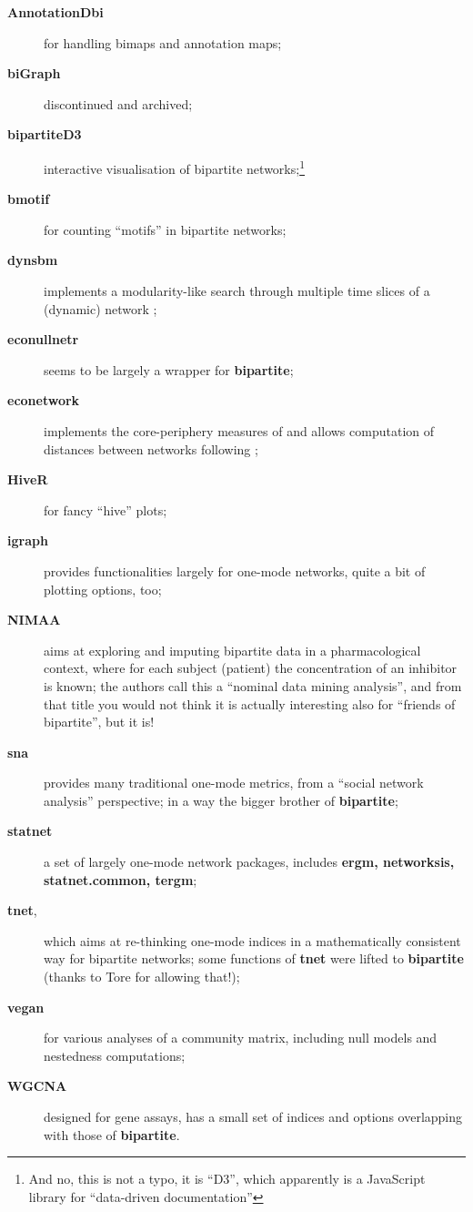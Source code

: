 \documentclass[a4paper, 11pt]{article}\usepackage[]{graphicx}\usepackage[dvipsnames]{xcolor}
\newcommand{\package}[1]{\textbf{#1}}
\begin{document}
\begin{description}
\item[\package{AnnotationDbi}] for handling bimaps and annotation maps;
\item[\package{biGraph}] discontinued and archived;
\item[\package{bipartiteD3}] interactive visualisation of bipartite networks;\footnote{And no, this is not a typo, it is ``D3'', which apparently is a JavaScript library for ``data-driven documentation''}
\item[\package{bmotif}] for counting ``motifs'' in bipartite networks;
\item[\package{dynsbm}] implements a modularity-like search through multiple time slices of a (dynamic) network \citep[``dynamic stochastic block model''][]{Miele2017};
\item[\package{econullnetr}] seems to be largely a wrapper for \package{bipartite};
\item[\package{econetwork}] implements the core-periphery measures of \citet{MartinGonzalez2020} and allows computation of distances between networks following \citet{Ohlmann2019};
\item[\package{HiveR}] for fancy ``hive'' plots;
\item[\package{igraph}] provides functionalities largely for one-mode networks, quite a bit of plotting options, too;
\item[\package{NIMAA}] aims at exploring and imputing bipartite data in a pharmacological context, where for each subject (patient) the concentration of an inhibitor is known; the authors call this a ``nominal data mining analysis'', and from that title you would not think it is actually interesting also for ``friends of bipartite'', but it is!
\item[\package{sna}] provides many traditional one-mode metrics, from a ``social network analysis'' perspective; in a way the bigger brother of \package{bipartite};
\item[\package{statnet}] a set of largely one-mode network packages, includes \package{ergm, networksis, statnet.common, tergm};
\item[\package{tnet},] which aims at re-thinking one-mode indices in a mathematically consistent way for bipartite networks; some functions of \package{tnet} were lifted to \package{bipartite} (thanks to Tore for allowing that!);
\item[\package{vegan}] for various analyses of a community matrix, including null models and nestedness computations;
\item[\package{WGCNA}] designed for gene assays, has a small set of indices and options overlapping with those of \package{bipartite}.
\end{description}
\end{document}

